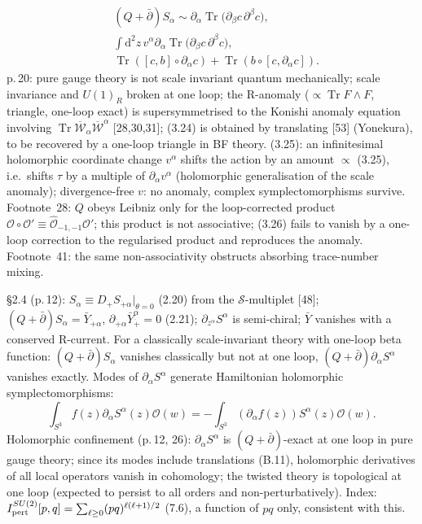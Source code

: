 \documentclass[11pt]{article}
\newcommand{\Tr}{\operatorname{Tr}}
\newcommand{\dpl}{\dot{+}}
\newcommand{\pb}{\bar{\partial}}
\newcommand{\cO}{\mathcal{O}}
\begin{document}
\begin{align}
&(Q+\pb)S_\alpha\sim\partial_\alpha\Tr\big(\partial_\beta c\,\partial^\beta c\big), \tag{3.24}\\
&\int\mathrm d^2z\,v^\alpha\partial_\alpha\Tr\big(\partial_\beta c\,\partial^\beta c\big), \tag{3.25}\\
&\Tr([c,b]\circ\partial_\alpha c)+\Tr(b\circ[c,\partial_\alpha c]). \tag{3.26}
\end{align}
p.\,20: pure gauge theory is not scale invariant quantum mechanically; scale invariance and $U(1)_R$ broken at one loop; the R-anomaly ($\propto\Tr F\wedge F$, triangle, one-loop exact) is supersymmetrised to the Konishi anomaly equation involving $\Tr\overline{\mathcal W}_\alpha\overline{\mathcal W}^\alpha$ [28,30,31]; (3.24) is obtained by translating [53] (Yonekura), to be recovered by a one-loop triangle in BF theory. (3.25): an infinitesimal holomorphic coordinate change $v^\alpha$ shifts the action by an amount $\propto$ (3.25), i.e.\ shifts $\tau$ by a multiple of $\partial_\alpha v^\alpha$ (holomorphic generalisation of the scale anomaly); divergence-free $v$: no anomaly, complex symplectomorphisms survive. Footnote~28: $Q$ obeys Leibniz only for the loop-corrected product $\cO\circ\cO'\equiv\widehat{\cO}_{-1,-1}\cO'$; this product is not associative; (3.26) fails to vanish by a one-loop correction to the regularised product and reproduces the anomaly. Footnote~41: the same non-associativity obstructs absorbing trace-number mixing.

§2.4 (p.\,12): $S_\alpha\equiv D_{\dpl}S_{\dpl\alpha}|_{\theta=0}$ (2.20) from the $\mathcal S$-multiplet [48]; $(Q+\pb)S_\alpha=\bar Y_{\dpl\alpha}$, $\partial_{\dpl\alpha}\bar Y^\alpha_{\dpl}=0$ (2.21); $\partial_{z^\alpha}S^\alpha$ is semi-chiral; $\bar Y$ vanishes with a conserved R-current. For a classically scale-invariant theory with one-loop beta function: $(Q+\pb)S_\alpha$ vanishes classically but not at one loop, $(Q+\pb)\partial_\alpha S^\alpha$ vanishes exactly. Modes of $\partial_\alpha S^\alpha$ generate Hamiltonian holomorphic symplectomorphisms:
\begin{equation}
\int_{S^3}f(z)\partial_\alpha S^\alpha(z)\cO(w)=-\int_{S^3}(\partial_\alpha f(z))S^\alpha(z)\cO(w). \tag{2.22}
\end{equation}
Holomorphic confinement (p.\,12, 26): $\partial_\alpha S^\alpha$ is $(Q+\pb)$-exact at one loop in pure gauge theory; since its modes include translations (B.11), holomorphic derivatives of all local operators vanish in cohomology; the twisted theory is topological at one loop (expected to persist to all orders and non-perturbatively). Index: $I^{SU(2)}_{\rm pert}[p,q]=\sum_{\ell\geq0}(pq)^{\ell(\ell+1)/2}$ (7.6), a function of $pq$ only, consistent with this.
\end{document}
